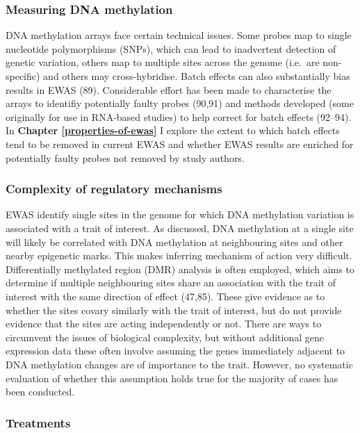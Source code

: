 \documentclass[11pt,oneside]{bristolthesis}
\begin{document}
\hypertarget{measuring-dna-methylation}{%
\subsubsection{Measuring DNA methylation}\label{measuring-dna-methylation}}

DNA methylation arrays face certain technical issues. Some probes map to single nucleotide polymorphisms (SNPs), which can lead to inadvertent detection of genetic variation, others map to multiple sites across the genome (i.e.~are non-specific) and others may cross-hybridise. Batch effects can also substantially bias results in EWAS (89). Considerable effort has been made to characterise the arrays to identifiy potentially faulty probes (90,91) and methods developed (some originally for use in RNA-based studies) to help correct for batch effects (92--94). In \textbf{Chapter \ref{properties-of-ewas}} I explore the extent to which batch effects tend to be removed in current EWAS and whether EWAS results are enriched for potentially faulty probes not removed by study authors.

\hypertarget{complexity-of-regulatory-mechanisms}{%
\subsubsection{Complexity of regulatory mechanisms}\label{complexity-of-regulatory-mechanisms}}

EWAS identify single sites in the genome for which DNA methylation variation is associated with a trait of interest. As discussed, DNA methylation at a single site will likely be correlated with DNA methylation at neighbouring sites and other nearby epigenetic marks. This makes inferring mechanism of action very difficult. Differentially methylated region (DMR) analysis is often employed, which aims to determine if multiple neighbouring sites share an association with the trait of interest with the same direction of effect (47,85). These give evidence as to whether the sites covary similarly with the trait of interest, but do not provide evidence that the sites are acting independently or not. There are ways to circumvent the issues of biological complexity, but without additional gene expression data these often involve assuming the genes immediately adjacent to DNA methylation changes are of importance to the trait. However, no systematic evaluation of whether this assumption holds true for the majority of cases has been conducted.

\hypertarget{treatments}{%
\subsubsection{Treatments}\label{treatments}}
\end{document}
